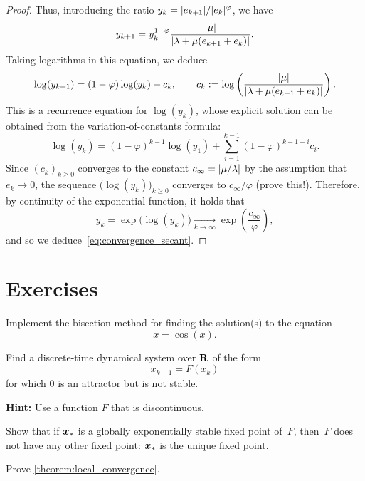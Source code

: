 \begin{proof}
    Thus, introducing the ratio $y_k = \lvert e_{k+1}\rvert/\lvert e_k\rvert^{\varphi}$,
    we have
    \[
        y_{k+1} = y_k^{1 - \varphi} \frac{\lvert\mu\rvert}{\lvert\lambda + \mu (e_{k+1} + e_k)\rvert}.
    \]
    Taking logarithms in this equation,
    we deduce
    \[
        \log(y_{k+1}) = (1 - \varphi) \log(y_k) + c_k,
        \qquad c_k := \log \left( \frac{\lvert\mu\rvert}{\lvert\lambda + \mu (e_{k+1} + e_k)\rvert} \right).
    \]
    This is a recurrence equation for $\log(y_k)$,
    whose explicit solution can be obtained from the variation-of-constants formula:
    \[
        \log(y_k) = (1 - \varphi)^{k-1} \log(y_1) + \sum_{i=1}^{k-1} (1 - \varphi)^{k-1-i} c_i.
    \]
    Since $(c_k)_{k \geq 0}$ converges to the constant $c_{\infty} = \lvert\mu/\lambda\rvert$ by the assumption that $e_k \to 0$,
    the sequence $\bigl(\log(y_k)\bigr)_{k\geq 0}$ converges to $c_{\infty} / \varphi$ (prove this!).
    Therefore, by continuity of the exponential function,
    it holds that
    \[
        y_k =  \exp \bigl(  \log(y_k) \bigr) \xrightarrow[k \to \infty]{} \exp \left( \frac{c_{\infty}}{\varphi} \right),
    \]
    and so we deduce~\eqref{eq:convergence_secant}.
\end{proof}

\section{Exercises}

\begin{compexercise}
Implement the bisection method for finding the solution(s) to the equation
\[
    x = \cos(x).
\]
\end{compexercise}

\begin{exercise}
    Find a discrete-time dynamical system over $\mathbf R$ of the form
    \[
        x_{k+1} = F(x_{k})
    \]
    for which $0$ is an attractor but is not stable.

    \noindent \textbf{Hint:} Use a function $F$ that is discontinuous.
\end{exercise}

\begin{exercise}
    \label{exercise:global_exponential_stability}
    Show that if $\mathbf{\boldsymbol{x}}_*$ is a globally exponentially stable fixed point of~$F$,
    then~$F$ does not have any other fixed point: $\mathbf{\boldsymbol{x}}_*$ is the unique fixed point.
\end{exercise}

\begin{exercise}
    \label{exercise:prove_local_convergence}
    Prove \cref{theorem:local_convergence}.
\end{exercise}

